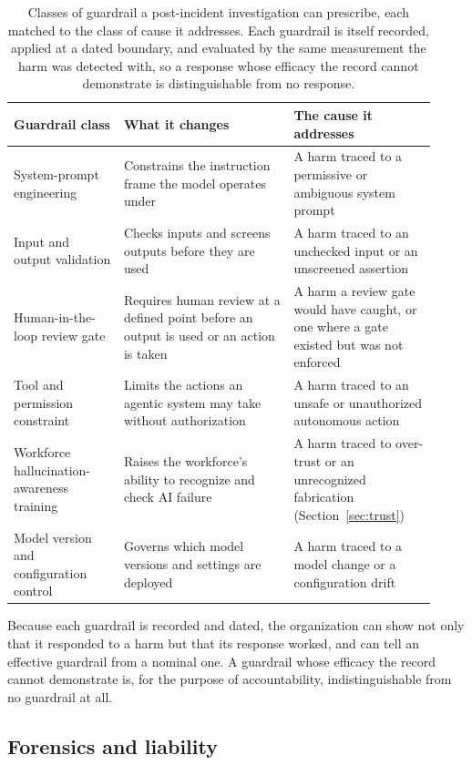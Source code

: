 \documentclass[11pt]{article}
\begin{document}
\begin{table}[t]
\centering
\small
\begin{tabular}{p{0.24\linewidth}p{0.37\linewidth}p{0.31\linewidth}}
\toprule
Guardrail class & What it changes & The cause it addresses \\
\midrule
System-prompt engineering & Constrains the instruction frame the model operates under & A harm traced to a permissive or ambiguous system prompt \\
Input and output validation & Checks inputs and screens outputs before they are used & A harm traced to an unchecked input or an unscreened assertion \\
Human-in-the-loop review gate & Requires human review at a defined point before an output is used or an action is taken & A harm a review gate would have caught, or one where a gate existed but was not enforced \\
Tool and permission constraint & Limits the actions an agentic system may take without authorization & A harm traced to an unsafe or unauthorized autonomous action \\
Workforce hallucination-awareness training & Raises the workforce's ability to recognize and check AI failure & A harm traced to over-trust or an unrecognized fabrication (Section~\ref{sec:trust}) \\
Model version and configuration control & Governs which model versions and settings are deployed & A harm traced to a model change or a configuration drift \\
\bottomrule
\end{tabular}
\caption{Classes of guardrail a post-incident investigation can prescribe, each
matched to the class of cause it addresses. Each guardrail is itself recorded,
applied at a dated boundary, and evaluated by the same measurement the harm was
detected with, so a response whose efficacy the record cannot demonstrate is
distinguishable from no response.}
\label{tab:guardrails}
\end{table}

Because each guardrail is recorded and dated, the organization can show not only
that it responded to a harm but that its response worked, and can tell an effective
guardrail from a nominal one. A guardrail whose efficacy the record cannot
demonstrate is, for the purpose of accountability, indistinguishable from no
guardrail at all.

\subsection{Forensics and liability}
\end{document}
